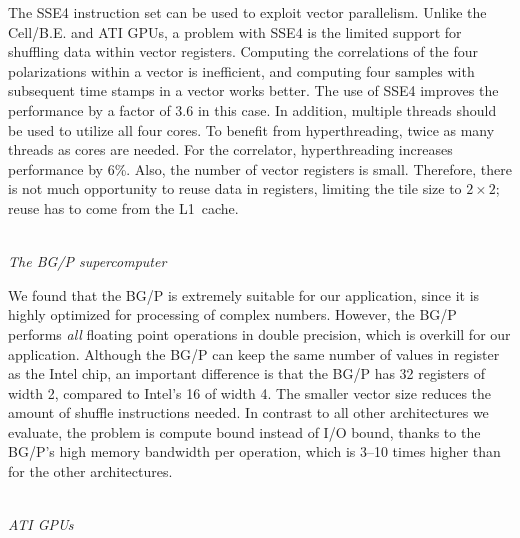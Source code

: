 \documentclass{article}
\begin{document}
\noindent The SSE4 instruction set can be used to exploit vector parallelism.  
Unlike the \mbox{Cell/B.E.} and ATI GPUs, a
problem with SSE4 is the limited support for shuffling data within
vector registers.  Computing the
correlations of the four polarizations within a vector is
inefficient, and computing four samples with subsequent time stamps in a vector works
better. 
The use of SSE4 improves the performance by a factor of 3.6
in this case.  In addition, multiple threads should be used to utilize all
four cores.  To benefit from hyperthreading, twice as many
threads as cores are needed.  For the correlator, hyperthreading increases performance by 6\%. 
Also, the number of vector registers is small.
Therefore, there is not much opportunity to reuse data in registers,
limiting the tile size to $2 \times 2$; reuse has to come from the
L1~cache.


\noindent \\ \emph{The BG/P supercomputer}

\noindent 
We found that the BG/P is extremely suitable for our application,
since it is highly optimized for processing of complex numbers.
However, the BG/P performs \emph{all} floating point operations in double
precision, which is overkill for our application.
Although the BG/P can keep the same number of values in register as the 
Intel chip, an important difference is that the BG/P has 32
registers of width 2, compared to Intel's 16 of width 4.  The smaller
vector size reduces the amount of shuffle instructions needed.
In contrast to all other architectures we evaluate, the problem is compute
bound instead of I/O bound, thanks to the BG/P's high memory bandwidth per
operation, which is 3--10 times higher than for the other architectures.


\noindent \\ \emph{ATI GPUs}
\end{document}
